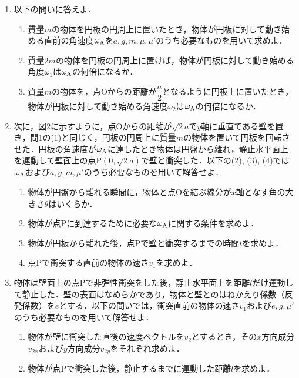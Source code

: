 \begin{enumerate}[label=\textbf{問\arabic*}]
  \item {\hzw}以下の問いに答えよ．
  \begin{enumerate}[(1)]
    \item {\hzw}質量$m$の物体を円板の円周上に置いたとき，物体が円板に対して動き始める直前の角速度$\omega_\mathrm{A}$を$a, g, m, \mu, \mu'$のうち必要なものを用いて求めよ．
    \item {\hzw}質量$2m$の物体を円板の円周上に置けば，物体が円板に対して動き始める角度$\omega_1$は$\omega_\mathrm{A}$の何倍になるか．
    \item {\hzw}質量$m$の物体を，点Oからの距離が$\dfrac{a}{2}$となるように円板上に置いたとき，物体が円板に対して動き始める角速度$\omega_2$は$\omega_\mathrm{A}$の何倍になるか．
  \end{enumerate}
  \item {\hzw}次に，図2に示すように，点Oからの距離が$\sqrt{2}a$で$y$軸に垂直である壁を置き，問1の(1)と同じく，円板の円周上に質量$m$の物体を置いて円板を回転させた．円板の角速度が$\omega_\mathrm{A}$に達したとき物体は円盤から離れ，静止水平面上を運動して壁面上の点P$(0, \sqrt{2}a)$で壁と衝突した．以下の(2), (3), (4)では$\omega_\mathrm{A}$および$a, g, m, \mu'$のうち必要なものを用いて解答せよ．
  \begin{enumerate}[(1)]
    \item {\hzw}物体が円盤から離れる瞬間に，物体と点Oを結ぶ線分が$x$軸となす角の大きさ$\theta$はいくらか．
    \item {\hzw}物体が点Pに到達するために必要な$\omega_\mathrm{A}$に関する条件を求めよ．
    \item {\hzw}物体が円板から離れた後，点Pで壁と衝突するまでの時間$t$を求めよ．
    \item {\hzw}点Pで衝突する直前の物体の速さ$v_1$を求めよ．
  \end{enumerate}
  \item {\hzw}物体は壁面上の点Pで非弾性衝突をした後，静止水平面上を距離$l$だけ運動して静止した．壁の表面はなめらかであり，物体と壁とのはねかえり係数（反発係数）を$e$とする．以下の問いでは，衝突直前の物体の速さ$v_1$および$e, g, \mu'$のうち必要なものを用いて解答せよ．
  \begin{enumerate}[(1)]
    \item {\hzw}物体が壁に衝突した直後の速度ベクトルを$v_2$とするとき，その$x$方向成分$v_{2x}$および$y$方向成分$v_{2y}$をそれぞれ求めよ．
    \item {\hzw}物体が点Pで衝突した後，静止するまでに運動した距離$l$を求めよ．
  \end{enumerate}
\end{enumerate}
